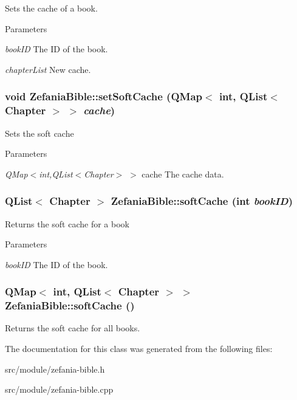 \label{classZefaniaBible_aed51eb121c18afbb927fd9dd27eb067c}
Sets the cache of a book. 
\begin{DoxyParams}{Parameters}
\item[{\em bookID}]The ID of the book. \item[{\em chapterList}]New cache. \end{DoxyParams}
\hypertarget{classZefaniaBible_a448849cb1b174285d54022dcb86ab8f3}{
\subsubsection[{setSoftCache}]{\setlength{\rightskip}{0pt plus 5cm}void ZefaniaBible::setSoftCache (QMap$<$ int, QList$<$ {\bf Chapter} $>$ $>$ {\em cache})}}
\label{classZefaniaBible_a448849cb1b174285d54022dcb86ab8f3}
Sets the soft cache 
\begin{DoxyParams}{Parameters}
\item[{\em QMap$<$int,QList$<$Chapter$>$}]$>$ cache The cache data. \end{DoxyParams}
\hypertarget{classZefaniaBible_a89c9044afabfd52fc35a9ec2ce7c53e7}{
\subsubsection[{softCache}]{\setlength{\rightskip}{0pt plus 5cm}QList$<$ {\bf Chapter} $>$ ZefaniaBible::softCache (int {\em bookID})}}
\label{classZefaniaBible_a89c9044afabfd52fc35a9ec2ce7c53e7}
Returns the soft cache for a book 
\begin{DoxyParams}{Parameters}
\item[{\em bookID}]The ID of the book. \end{DoxyParams}
\hypertarget{classZefaniaBible_abc7e89561a9b87d4cb5511f29c7e51a6}{
\subsubsection[{softCache}]{\setlength{\rightskip}{0pt plus 5cm}QMap$<$ int, QList$<$ {\bf Chapter} $>$ $>$ ZefaniaBible::softCache ()}}
\label{classZefaniaBible_abc7e89561a9b87d4cb5511f29c7e51a6}
Returns the soft cache for all books. 

The documentation for this class was generated from the following files:\begin{DoxyCompactItemize}
\item 
src/module/zefania-\/bible.h\item 
src/module/zefania-\/bible.cpp\end{DoxyCompactItemize}
